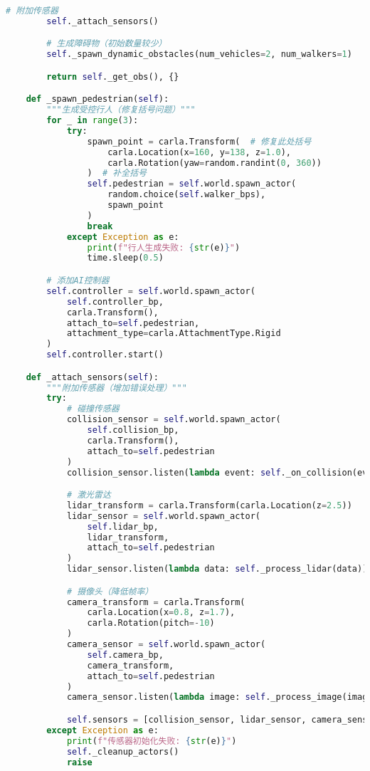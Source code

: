 \begin{lstlisting}[language=Python]
        # 附加传感器
        self._attach_sensors()

        # 生成障碍物（初始数量较少）
        self._spawn_dynamic_obstacles(num_vehicles=2, num_walkers=1)

        return self._get_obs(), {}

    def _spawn_pedestrian(self):
        """生成受控行人（修复括号问题）"""
        for _ in range(3):
            try:
                spawn_point = carla.Transform(  # 修复此处括号
                    carla.Location(x=160, y=138, z=1.0),
                    carla.Rotation(yaw=random.randint(0, 360))
                )  # 补全括号
                self.pedestrian = self.world.spawn_actor(
                    random.choice(self.walker_bps),
                    spawn_point
                )
                break
            except Exception as e:
                print(f"行人生成失败: {str(e)}")
                time.sleep(0.5)

        # 添加AI控制器
        self.controller = self.world.spawn_actor(
            self.controller_bp,
            carla.Transform(),
            attach_to=self.pedestrian,
            attachment_type=carla.AttachmentType.Rigid
        )
        self.controller.start()

    def _attach_sensors(self):
        """附加传感器（增加错误处理）"""
        try:
            # 碰撞传感器
            collision_sensor = self.world.spawn_actor(
                self.collision_bp,
                carla.Transform(),
                attach_to=self.pedestrian
            )
            collision_sensor.listen(lambda event: self._on_collision(event))

            # 激光雷达
            lidar_transform = carla.Transform(carla.Location(z=2.5))
            lidar_sensor = self.world.spawn_actor(
                self.lidar_bp,
                lidar_transform,
                attach_to=self.pedestrian
            )
            lidar_sensor.listen(lambda data: self._process_lidar(data))

            # 摄像头（降低帧率）
            camera_transform = carla.Transform(
                carla.Location(x=0.8, z=1.7),
                carla.Rotation(pitch=-10)
            )
            camera_sensor = self.world.spawn_actor(
                self.camera_bp,
                camera_transform,
                attach_to=self.pedestrian
            )
            camera_sensor.listen(lambda image: self._process_image(image))

            self.sensors = [collision_sensor, lidar_sensor, camera_sensor]
        except Exception as e:
            print(f"传感器初始化失败: {str(e)}")
            self._cleanup_actors()
            raise


\end{lstlisting}
